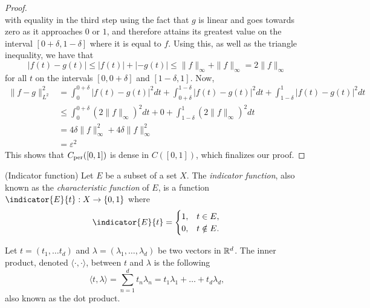\documentclass[../thesis.tex]{subfiles}
\begin{document}
\begin{proof}
\begin{equation*}
    \end{equation*}
    with equality in the third step using the fact that $g$ is linear and goes towards zero as it approaches $0$ or $1$, and therefore attains its greatest value on the interval $[0+\delta,1-\delta]$ where it is equal to $f$. Using this, as well as the triangle inequality, we have that
    \begin{equation*}
        \left|f(t)-g(t) \right| \leq |f(t)| + |-g(t)| \leq \|f \|_{\infty} + \|f \|_{\infty} = 2 \|f \|_{\infty}
    \end{equation*}
    for all $t$ on the intervals $[0, 0+\delta]$ and $[1-\delta,1]$. Now,
    \begin{align*}
        \| f-g \|_{L^2}^2 &=  \int_0^{0+\delta} \left|f(t)-g(t) \right|^2dt + \int_{0+\delta}^{1-\delta} \left|f(t)-g(t) \right|^2dt +\int_{1-\delta}^{1} \left|f(t)-g(t) \right|^2dt\\ 
        &\leq \int_0^{0+\delta} (2 \| f\|_\infty)^2dt + 0 +\int_{1-\delta}^{1} (2 \| f\|_\infty)^2dt\\
        &=  4 \delta \| f\|_\infty^2 + 4 \delta \| f\|_\infty^2\\ 
        &= \varepsilon^2
    \end{align*}
    This shows that $C_{\text{per}}([0,1])$ is dense in $C([0,1])$, which finalizes our proof.
\end{proof}

\begin{definition}(Indicator function)\label{def:indicator}
    Let $E$ be a subset of a set $X$. The \emph{indicator function}, also known as the \emph{characteristic function} of $E$, is a function $\indicator{E}{t}: X \rightarrow \braq{0,1}$ where
    \begin{equation*}
        \indicator{E}{t}  = 
        \begin{cases} 
            1, &  t\in E,\\
            0, &  t \notin E.
        \end{cases}
        \qedhere
    \end{equation*}
\end{definition}


\begin{definition}\label{def:dot_prod}
    Let $t=(t_1,\dots t_d)$ and $\lambda=(\lambda_1, \dots, \lambda_d)$ be two vectors in $\mathbb{R}^d$. The inner product, denoted $\langle \cdot, \cdot \rangle$, between $t$ and $\lambda$ is the following 
    \begin{equation*}
        \langle t, \lambda \rangle = \sum_{n=1}^d t_n \lambda_n = t_1\lambda_1 + \dots + t_d\lambda_d,
    \end{equation*}
    also known as the dot product. 
\end{definition}
\end{document}

